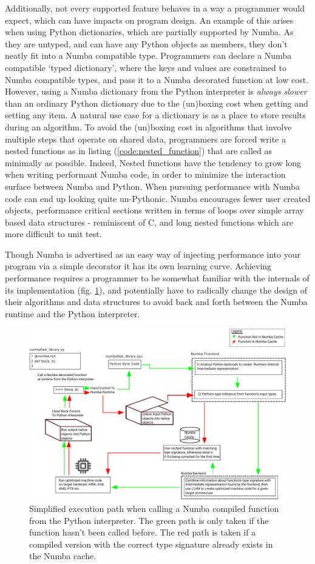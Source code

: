 \documentclass{IEEEcsmag}
\begin{document}
Additionally, not every supported feature behaves in a way a programmer would expect, which can have impacts on program design. An example of this arises when using Python dictionaries, which are partially supported by Numba. As they are untyped, and can have any Python objects as members, they don't neatly fit into a Numba compatible type. Programmers can declare a Numba compatible `typed dictionary', where the keys and values are constrained to Numba compatible types, and pass it to a Numba decorated function at low cost. However, using a Numba dictionary from the Python interpreter is \textit{always slower} than an ordinary Python dictionary due to the (un)boxing cost when getting and setting any item. A natural use case for a dictionary is as a place to store results during an algorithm. To avoid the (un)boxing cost in algorithms that involve multiple steps that operate on shared data, programmers are forced write a nested functions as in listing (\ref{code:nested_function}) that are called as minimally as possible. Indeed, Nested functions have the tendency to grow long when writing performant Numba code, in order to minimize the interaction surface between Numba and Python. When pursuing performance with Numba code can end up looking quite un-Pythonic. Numba encourages fewer user created objects, performance critical sections written in terms of loops over simple array based data structures - reminiscent of C, and long nested functions which are more difficult to unit test.

Though Numba is advertised as an easy way of injecting performance into your program via a simple decorator it has its own learning curve. Achieving performance requires a programmer to be somewhat familiar with the internals of its implementation (fig. \ref{fig:numba}), and potentially have to radically change the design of their algorithms and data structures to avoid back and forth between the Numba runtime and the Python interpreter.

\begin{figure}
    \centerline{\includegraphics {figures/numba.pdf}}
    \caption{Simplified execution path when calling a Numba compiled function from the Python interpreter. The green path is only taken if the function hasn't been called before. The red path is taken if a compiled version with the correct type signature already exists in the Numba cache.}
    \label{fig:numba}
\end{figure}
\end{document}
